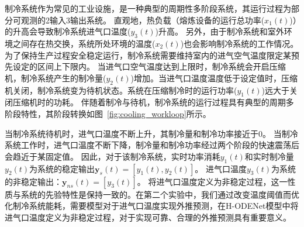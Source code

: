 制冷系统作为常见的工业设施，是一种典型的周期性多阶段系统，其运行过程为部分可观测的2输入3输出系统。
直观地，热负载（熔炼设备的运行总功率($x_1(t)$)）的升高会导致制冷系统进气口温度($y_3(t)$)升高。
另外，由于制冷系统和室外环境之间存在热交换，系统所处环境的温度($x_2(t)$)也会影响制冷系统的工作情况。
为了保持生产过程安全稳定运行，制冷系统需要维持室内的进气空气温度限定某预先设定的区间上下限内。
当进气口空气温度达到上限时，制冷系统会开启压缩机，制冷系统产生的制冷量($y_2(t)$)增加。当进气口温度温度低于设定值时，压缩机关闭，制冷系统变为待机状态。系统在压缩制冷时的运行功率($y_1(t)$)远大于关闭压缩机时的功耗。
伴随着制冷与待机，制冷系统的运行过程具有典型的周期多阶段特性，其阶段转换如图~\ref{fig:cooling_workloop}所示。 

当制冷系统待机时，进气口温度不断上升，其制冷量和制冷功率接近于0。
当制冷系统工作时，进气口温度不断下降，制冷量和制冷功率经过两个阶段的快速震荡后会趋近于某固定值。
因此，对于该制冷系统，实时功率消耗$y_1(t)$和实时制冷量$y_2(t)$为系统的稳定输出$\boldsymbol y_s(t)=[y_1(t), y_2(t)]$。
进气口温度$y_3(t)$为系统的非稳定输出：$\boldsymbol y_{ns}(t)=[y_3(t)]$。
将进气口温度定义为非稳定过程，这一性质与系统的先验特性是保持一致的。在第二个实验中，我们通过改变温度阈值而优化制冷系统能耗，需要模型对于进气口温度实现外推预测，在H-ODENet模型中将进气口温度定义为非稳定过程，对于实现可靠、合理的外推预测具有重要意义。



